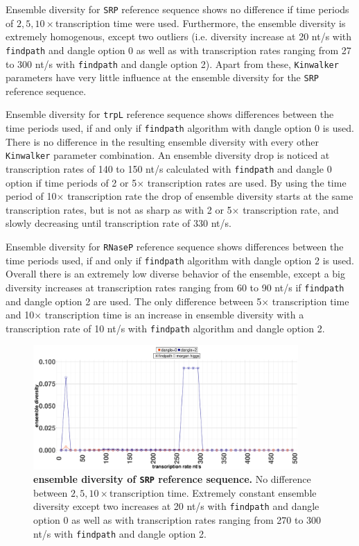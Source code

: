 \documentclass[ twoside,openright,titlepage,numbers=noenddot,headinclude,%
                footinclude=false, cleardoublepage=empty,abstractoff, %
                BCOR=5mm,paper=a4,fontsize=11pt,%
                ngerman,american,%
                ]{scrreprt}
\begin{document}
Ensemble diversity for \texttt{SRP} reference sequence shows no difference if time periods of $2,5,10 \times$transcription time were used. Furthermore, the ensemble diversity is extremely homogenous, except two outliers (i.e. diversity increase at 20 nt/s with \texttt{findpath} and dangle option $0$ as well as with transcription rates ranging from 27 to 300 nt/s with \texttt{findpath} and dangle option 2). Apart from these, \texttt{Kinwalker} parameters have very little influence  at the ensemble diversity for the \texttt{SRP} reference sequence.


Ensemble diversity for \texttt{trpL} reference sequence shows differences between the time periods used, if and only if \texttt{findpath} algorithm with dangle option 0 is used. There is no difference in the resulting ensemble diversity with every other \texttt{Kinwalker} parameter combination.
An ensemble diversity drop is noticed at transcription rates of 140 to 150 nt/s calculated with \texttt{findpath} and dangle $0$ option if time periods of 2 or 5$\times$ transcription rates are used.
By using the time period of 10$\times$ transcription rate the drop of ensemble diversity starts at the same transcription rates, but is not as sharp as with 2 or 5$\times$ transcription rate, and slowly decreasing until transcription rate of 330 nt/s.

Ensemble diversity for \texttt{RNaseP} reference sequence shows differences between the time periods used, if and only if \texttt{findpath} algorithm with dangle option 2 is used. Overall there is an extremely low diverse behavior of the ensemble, except a big diversity increases at transcription rates ranging from 60 to 90 nt/s if \texttt{findpath} and dangle option 2 are used. 
The only difference between 5$\times$ transcription time and 10$\times$ transcription time is an increase in ensemble diversity with a transcription rate of 10 nt/s with \texttt{findpath} algorithm and dangle option 2.


\begin{figure}[ht]
\includegraphics[width=0.9\textwidth]{./pictures/ensembleDiversity/SRP2510.pdf}
\caption{{\bf ensemble diversity of \texttt{SRP} reference sequence.}
No difference between $2,5,10 \times$transcription time. Extremely constant ensemble diversity except two increases at 20 nt/s with \texttt{findpath} and dangle option $0$ as well as with transcription rates ranging from 270 to 300 nt/s with \texttt{findpath} and dangle option 2.
}
\label{fig:ensemble_diversity_X01074.1}
\end{figure}	
\end{document}
